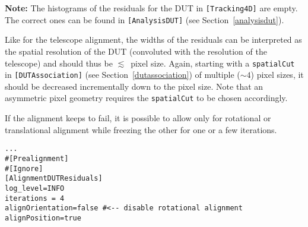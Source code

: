 \textbf{Note:} The histograms of the residuals for the DUT in \texttt{[Tracking4D]} are empty. The correct ones can be found in \texttt{[AnalysisDUT]} (see Section~\ref{analysisdut}).

Like for the telescope alignment, the widths of the residuals can be interpreted as the spatial resolution of the DUT (convoluted with the resolution of the telescope) and should thus be $\lesssim$~pixel size.
Again, starting with a \texttt{spatialCut} in \texttt{[DUTAssociation]} (see Section~\ref{dutassociation}) of multiple ($\sim4$) pixel sizes, it should be decreased incrementally down to the pixel size. Note that an asymmetric pixel geometry requires the \texttt{spatialCut} to be chosen accordingly.

If the alignment keeps to fail, it is possible to allow only for rotational or translational alignment while freezing the other for one or a few iterations.

\begin{verbatim}
...
#[Prealignment]
#[Ignore]
[AlignmentDUTResiduals]
log_level=INFO
iterations = 4
alignOrientation=false #<-- disable rotational alignment
alignPosition=true
\end{verbatim}
